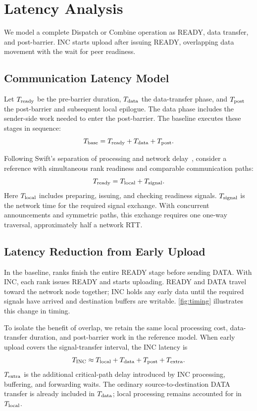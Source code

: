 \section{Latency Analysis}
\label{sec:model}
We model a complete Dispatch or Combine operation as READY, data transfer, and post-barrier. INC starts upload after issuing READY, overlapping data movement with the wait for peer readiness.

\subsection{Communication Latency Model}
\label{sec:delay-model}
Let $T_{\rm ready}$ be the pre-barrier duration, $T_{\rm data}$ the data-transfer phase, and $T_{\rm post}$ the post-barrier and subsequent local epilogue. The data phase includes the sender-side work needed to enter the post-barrier. The baseline executes these stages in sequence:
\begin{equation}
 T_{\rm base}=T_{\rm ready}+T_{\rm data}+T_{\rm post}.
 \label{eq:base}
\end{equation}

Following Swift's separation of processing and network delay~\cite{swift}, consider a reference with simultaneous rank readiness and comparable communication paths:
\begin{equation}
 T_{\rm ready}=T_{\rm local}+T_{\rm signal}.
 \label{eq:ready}
\end{equation}
Here $T_{\rm local}$ includes preparing, issuing, and checking readiness signals. $T_{\rm signal}$ is the network time for the required signal exchange. With concurrent announcements and symmetric paths, this exchange requires one one-way traversal, approximately half a network RTT.

\subsection{Latency Reduction from Early Upload}
\label{sec:readiness-analysis}
In the baseline, ranks finish the entire READY stage before sending DATA. With INC, each rank issues READY and starts uploading. READY and DATA travel toward the network node together; INC holds any early data until the required signals have arrived and destination buffers are writable. \autoref{fig:timing} illustrates this change in timing.



To isolate the benefit of overlap, we retain the same local processing cost, data-transfer duration, and post-barrier work in the reference model. When early upload covers the signal-transfer interval, the INC latency is
\begin{equation}
 T_{\rm INC}\approx T_{\rm local}+T_{\rm data}+T_{\rm post}+T_{\rm extra}.
 \label{eq:inc}
\end{equation}
$T_{\rm extra}$ is the additional critical-path delay introduced by INC processing, buffering, and forwarding waits. The ordinary source-to-destination DATA transfer is already included in $T_{\rm data}$; local processing remains accounted for in $T_{\rm local}$.

